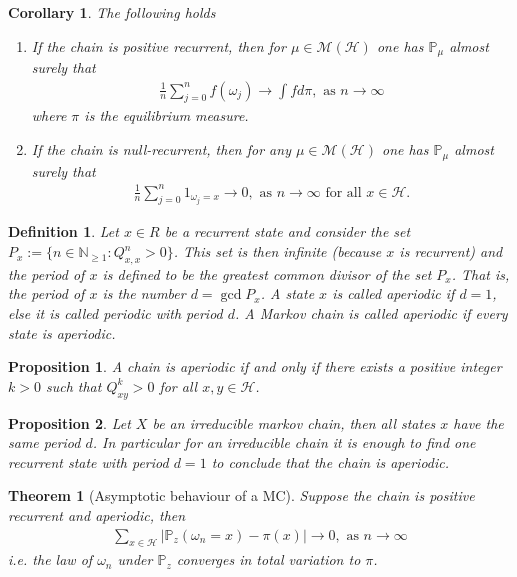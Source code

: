 \documentclass[11pt,a4paper, final]{article}
\newtheorem{thm}{Theorem}[section]
\newtheorem{prop}{Proposition}[section]
\newtheorem{cor}{Corollary}[section]
\newtheorem{defn}{Definition}[section]
\theoremstyle{definition}
\begin{document}
\begin{cor} The following holds 
\begin{enumerate}
\item If the chain is positive recurrent, then for $\mu \in \mathcal{M}( \mathcal{H})$ one has $\mathbb{P}_\mu$ almost surely that 
\begin{align*}
\frac{1}{n} \sum_{j=0}^n f( \omega_j) \to \int f d \pi, \text{ as } n \to \infty 
\end{align*}
where $\pi$ is the equilibrium measure. 
\item If the chain is null-recurrent, then for any $\mu \in \mathcal{M}( \mathcal{H})$ one has $\mathbb{P}_\mu$ almost surely that 
\begin{align*}
\frac{1}{n} \sum_{j=0}^n 1_{ \omega_j = x } \to 0, \text{ as } n \to \infty \text{ for all } x \in \mathcal{H}.
\end{align*}
\end{enumerate}
\end{cor}
\begin{defn} Let $x \in R$ be a recurrent state and consider the set \\  $P_x:= \lbrace n \in \mathbb{N}_{ \geq 1} : Q_{x,x}^n >0 \rbrace$. This set is then infinite (because $x$ is recurrent) and the period of $x$ is defined to be the greatest common divisor of the set $P_x$. That is, the period of $x$ is the number $d= \gcd P_x$. A state $x$ is called aperiodic if $d=1$, else it is called periodic with period $d$. A Markov chain is called aperiodic if every state is aperiodic. 
\end{defn}
\begin{prop} A chain is aperiodic if and only if there exists a positive integer $k >0$ such that $Q_{xy}^k >0$ for all $x,y \in \mathcal{H}$.
\end{prop}
\begin{prop} Let $X$ be an irreducible markov chain, then all states $x$ have the same period $d$. In particular for an irreducible chain it is enough to find one recurrent state with period $d=1$ to conclude that the chain is aperiodic. 
\end{prop}
\begin{thm}[Asymptotic behaviour of a MC] Suppose the chain is positive recurrent and aperiodic, then 
\begin{align*}
\sum_{x \in \mathcal{H}} | \mathbb{P}_z( \omega_n =x) - \pi (x) | \to 0, \text{ as } n \to \infty 
\end{align*}
i.e. the law of $\omega_n$ under $\mathbb{P}_z$ converges in total variation to $\pi$. 
\end{thm}
\end{document}
